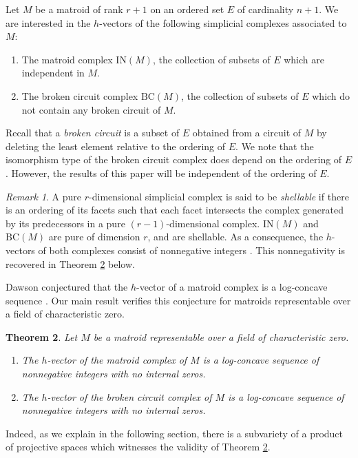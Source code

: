 \documentclass{compositio}
\newtheorem{theorem}{Theorem}
\theoremstyle{definition}
\theoremstyle{remark}
\newtheorem{remark}[theorem]{Remark}
\begin{document}
Let $M$ be a matroid of rank $r+1$ on an ordered set $E$ of cardinality $n+1$. We are interested in the $h$-vectors of the following simplicial complexes associated to $M$:
\begin{enumerate}[1.]
\item The matroid complex $\text{IN}(M)$, the collection of subsets of $E$ which are independent in $M$.
\item The broken circuit complex $\text{BC}(M)$, the collection of subsets of $E$ which do not contain any broken circuit of $M$. 
\end{enumerate}
Recall that a \emph{broken circuit} is a subset of $E$ obtained from a circuit of $M$ by deleting the least element relative to the ordering of $E$.
We note that the isomorphism type of the broken circuit complex does depend on the ordering of $E$. However, the results of this paper will be independent of the ordering of $E$.

\begin{remark}
A pure $r$-dimensional simplicial complex is said to be \emph{shellable} if there is an ordering of its facets
such that each facet intersects the complex generated by its predecessors in a pure $(r-1)$-dimensional complex.
$\text{IN}(M)$ and $\text{BC}(M)$ are pure of dimension $r$, and are shellable. As a consequence, the $h$-vectors of both complexes consist of nonnegative integers \cite{Bjorner3}. This nonnegativity is recovered in Theorem \ref{main} below.
\end{remark}


Dawson conjectured that the $h$-vector of a matroid complex is a log-concave sequence \cite[Conjecture 2.5]{Dawson}. Our main result verifies this conjecture for matroids representable over a field of characteristic zero.

\begin{theorem}\label{main}
Let $M$ be a matroid representable over a field of characteristic zero.
\begin{enumerate}
\item  The $h$-vector of the matroid complex of $M$ is a log-concave sequence of nonnegative integers with no internal zeros.
\item The $h$-vector of the broken circuit complex of $M$ is a log-concave sequence of nonnegative integers with no internal zeros.
\end{enumerate}
\end{theorem}

Indeed, as we explain in the following section, there is a subvariety of a product of projective spaces which witnesses the validity of Theorem \ref{main}. 
\end{document}
